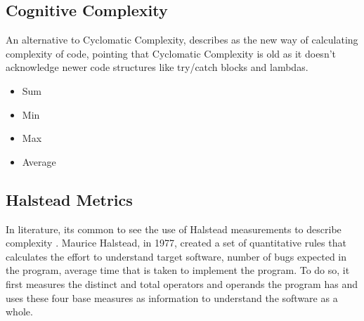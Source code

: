 \subsection{Cognitive Complexity}

An alternative to Cyclomatic Complexity, \cite{article:sonarpaper} describes as the new way of calculating complexity of code,
pointing that Cyclomatic Complexity is old as it doesn't acknowledge newer code structures like try/catch blocks and lambdas.

\begin{itemize}
  \item Sum 
  \item Min 
  \item Max 
  \item Average 
\end{itemize}

\subsection{Halstead Metrics}

In literature, its common to see the use of Halstead measurements to describe complexity \cite{article:complexity_with_halstead}.
Maurice Halstead, in 1977, created a set of quantitative rules that calculates the effort to understand target software, number of bugs
expected in the program, average time that is taken to implement the program. To do so, it first measures the distinct and total
operators and operands the program has and uses these four base measures as information to understand the software as a whole.

